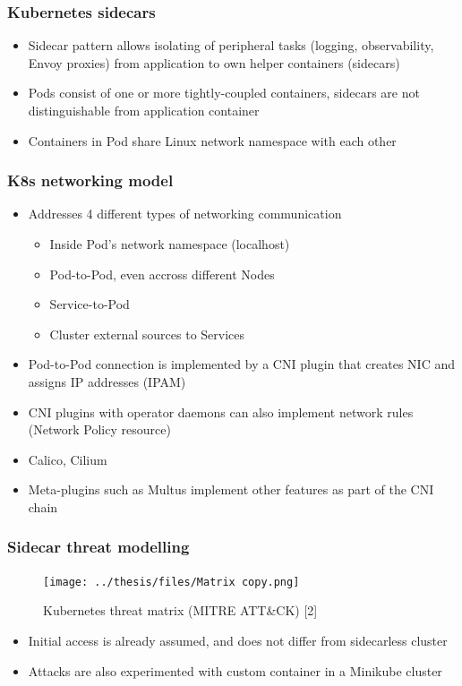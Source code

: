 \documentclass{beamer}
\begin{document}
\begin{frame}
\frametitle{Kubernetes sidecars}

\begin{itemize}
  \item Sidecar pattern allows isolating of peripheral tasks (logging, observability, Envoy proxies) from application to own helper containers (sidecars)
  \item Pods consist of one or more tightly-coupled containers, sidecars are not distinguishable from application container
  \item Containers in Pod share Linux network namespace with each other
\end{itemize}
\end{frame}

\begin{frame}
\frametitle{K8s networking model}

\begin{itemize}
  \item Addresses 4 different types of networking communication
  \begin{itemize}
    \item Inside Pod's network namespace (localhost)
    \item Pod-to-Pod, even accross different Nodes
    \item Service-to-Pod
    \item Cluster external sources to Services
  \end{itemize}
  \item Pod-to-Pod connection is implemented by a CNI plugin that creates NIC and assigns IP addresses (IPAM)
  \item CNI plugins with operator daemons can also implement network rules (Network Policy resource)
  \item Calico, Cilium
  \item Meta-plugins such as Multus implement other features as part of the CNI chain
\end{itemize}
\end{frame}

\begin{frame}
\frametitle{Sidecar threat modelling}

\begin{figure}[h!]
  \centering
  \texttt{[image: ../thesis/files/Matrix copy.png]}
  \caption{Kubernetes threat matrix (MITRE ATT\&CK) [2]}
\end{figure}

\begin{itemize}
  \item Initial access is already assumed, and does not differ from sidecarless cluster
  \item Attacks are also experimented with custom container in a Minikube cluster
\end{itemize}
\end{frame}
\end{document}

